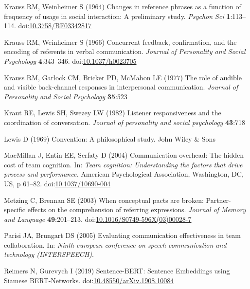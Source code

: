 \documentclass[
  english,
]{article}
\newlength{\cslhangindent}
\newlength{\cslentryspacingunit} %
\newenvironment{CSLReferences}[2] %
 {%
  \setlength{\parindent}{0pt}
  \ifodd #1
  \let\oldpar\par
  \def\par{\hangindent=\cslhangindent\oldpar}
  \fi
  \setlength{\parskip}{#2\cslentryspacingunit}
 }%
 {}
\begin{document}
\begin{CSLReferences}{1}{0}
\leavevmode{}%
Krauss RM, Weinheimer S (1964) Changes in reference phrases as a function of frequency of usage in social interaction: A preliminary study. \emph{Psychon Sci} \textbf{1}:113--114. doi:\href{https://doi.org/10.3758/BF03342817}{10.3758/BF03342817}

\leavevmode{}%
Krauss RM, Weinheimer S (1966) Concurrent feedback, confirmation, and the encoding of referents in verbal communication. \emph{Journal of Personality and Social Psychology} \textbf{4}:343--346. doi:\href{https://doi.org/10.1037/h0023705}{10.1037/h0023705}

\leavevmode{}%
Krauss RM, Garlock CM, Bricker PD, McMahon LE (1977) The role of audible and visible back-channel responses in interpersonal communication. \emph{Journal of Personality and Social Psychology} \textbf{35}:523

\leavevmode{}%
Kraut RE, Lewis SH, Swezey LW (1982) Listener responsiveness and the coordination of conversation. \emph{Journal of personality and social psychology} \textbf{43}:718

\leavevmode{}%
Lewis D (1969) Convention: A philosophical study. John Wiley \& Sons

\leavevmode{}%
MacMillan J, Entin EE, Serfaty D (2004) Communication overhead: {The} hidden cost of team cognition. In: \emph{Team cognition: {Understanding} the factors that drive process and performance.} American Psychological Association, Washington, DC, US, p 61--82. doi:\href{https://doi.org/10.1037/10690-004}{10.1037/10690-004}

\leavevmode{}%
Metzing C, Brennan SE (2003) When conceptual pacts are broken: {Partner-specific} effects on the comprehension of referring expressions. \emph{Journal of Memory and Language} \textbf{49}:201--213. doi:\href{https://doi.org/10.1016/S0749-596X(03)00028-7}{10.1016/S0749-596X(03)00028-7}

\leavevmode{}%
Parisi JA, Brungart DS (2005) Evaluating communication effectiveness in team collaboration. In: \emph{Ninth european conference on speech communication and technology (INTERSPEECH)}.

\leavevmode{}%
Reimers N, Gurevych I (2019) Sentence-{BERT}: {Sentence Embeddings} using {Siamese BERT-Networks}. doi:\href{https://doi.org/10.48550/arXiv.1908.10084}{10.48550/arXiv.1908.10084}


\end{CSLReferences}
\end{document}
